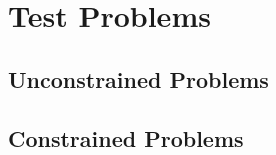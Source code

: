 \section{Test Problems}
\label{sec:52testProblems}

\blindtext{}

\subsection{Unconstrained Problems}
\label{sec:511unconstrainedProblems}

\blindtext{}

\subsection{Constrained Problems}
\label{sec:512constrainedProblems}

\blindtext{}
